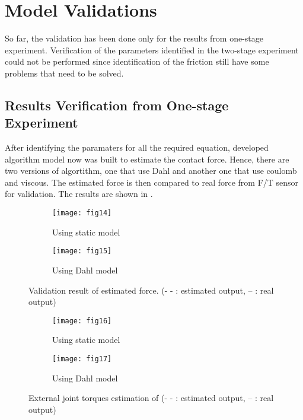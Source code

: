 \chapter{Model Validations}

So far, the validation has been done only for the results from one-stage experiment. Verification of the parameters identified in the two-stage experiment could not be performed since identification of the friction still have some problems that need to be solved. 

\section{Results Verification from One-stage Experiment}

After identifying the paramaters for all the required equation, developed algorithm model now was built to estimate the contact force. Hence, there are two versions of algortithm, one that use Dahl and another one that use coulomb and viscous. The estimated force is then compared to real force from F/T sensor for validation. The results are shown in .

\begin{figure}[H]
  \begin{subfigure}[t]{0.5\textwidth}
    \centering
    \texttt{[image: fig14]} 
    \caption{Using static model}
    \label{fig:static validation}
  \end{subfigure}
  \begin{subfigure}[t]{0.5\textwidth}
    \centering
    \texttt{[image: fig15]}
    \caption{Using Dahl model}
    \label{fig:Dahl validation}
  \end{subfigure}
  \caption{Validation result of estimated force. (- - : estimated output, -- : real output)}
  \label{fig:validation}
\end{figure}

\begin{figure}[H]
  \begin{subfigure}[t]{0.5\textwidth}
    \centering
    \texttt{[image: fig16]} 
    \caption{Using static model}
    \label{fig:static tor}
  \end{subfigure}
  \begin{subfigure}[t]{0.5\textwidth}
    \centering
    \texttt{[image: fig17]}
    \caption{Using Dahl model}
    \label{fig:Dahl tor}
  \end{subfigure}
  \caption{External joint torques estimation of  (- - : estimated output, -- : real output)}
  \label{fig:torque validation}
\end{figure}

